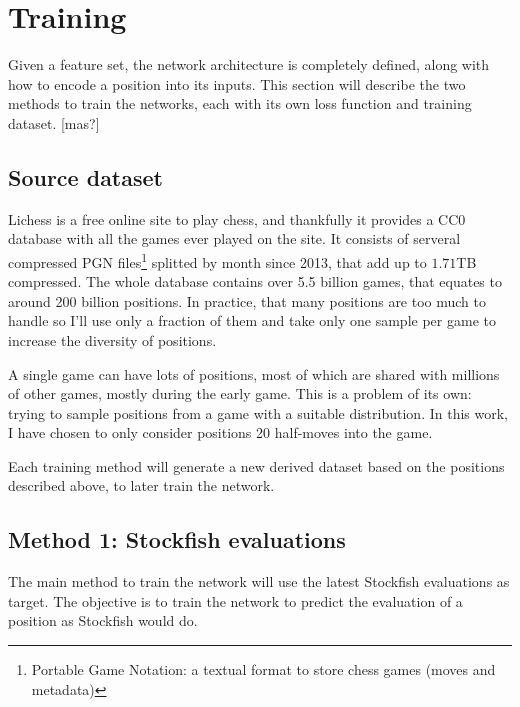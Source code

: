\section{Training}


Given a feature set, the network architecture is completely defined, along with how to encode a position into its inputs. This section will describe the two methods to train the networks, each with its own loss function and training dataset.
[mas?]

\subsection{Source dataset}

Lichess is a free online site to play chess, and thankfully it provides a CC0 database \cite{lichessdb} with all the games ever played on the site. It consists of serveral compressed PGN files\footnote{Portable Game Notation: a textual format to store chess games (moves and metadata)} splitted by month since 2013, that add up to $1.71$TB compressed. The whole database contains over 5.5 billion games, that equates to around 200 billion positions. In practice, that many positions are too much to handle so I'll use only a fraction of them and take only one sample per game to increase the diversity of positions.


A single game can have lots of positions, most of which are shared with millions of other
games, mostly during the early game. This is a problem of its own: trying to sample positions from a game with a suitable distribution. In this work, I have chosen to only consider positions 20 half-moves into the game.

Each training method will generate a new derived dataset based on the positions described above, to later train the network.

\subsection{Method 1: Stockfish evaluations}

The main method to train the network will use the latest Stockfish evaluations as target. The objective is to train the network to predict the evaluation of a position as Stockfish would do.

